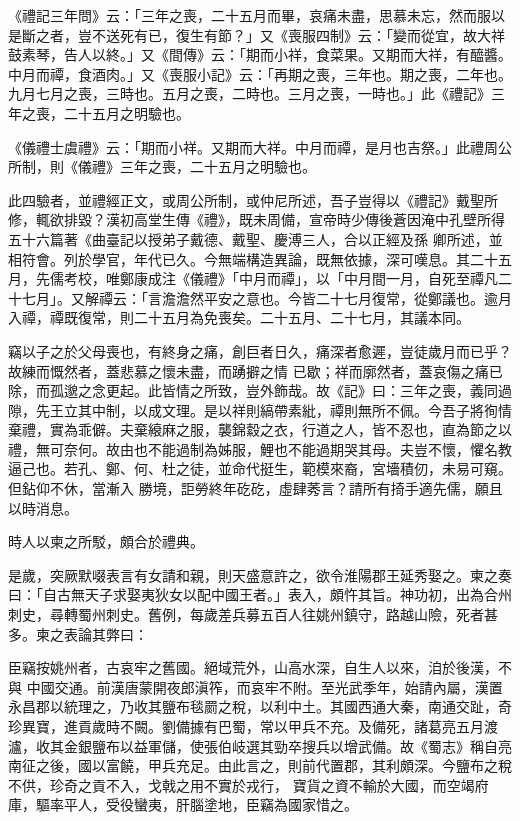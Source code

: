 \begin{pinyinscope}
 《禮記三年問》云：「三年之喪，二十五月而畢，哀痛未盡，思慕未忘，然而服以是斷之者，豈不送死有已，復生有節？」又《喪服四制》云：「變而從宜，故大祥鼓素琴，告人以終。」又《間傳》云：「期而小祥，食菜果。又期而大祥，有醯醬。中月而禫，食酒肉。」又《喪服小記》云：「再期之喪，三年也。期之喪，二年也。
 九月七月之喪，三時也。五月之喪，二時也。三月之喪，一時也。」此《禮記》三年之喪，二十五月之明驗也。



 《儀禮士虞禮》云：「期而小祥。又期而大祥。中月而禫，是月也吉祭。」此禮周公所制，則《儀禮》三年之喪，二十五月之明驗也。



 此四驗者，並禮經正文，或周公所制，或仲尼所述，吾子豈得以《禮記》戴聖所修，輒欲排毀？漢初高堂生傳《禮》，既未周備，宣帝時少傳後蒼因淹中孔壁所得五十六篇著《曲臺記以授弟子戴德、戴聖、慶溥三人，合以正經及孫
 卿所述，並相符會。列於學官，年代已久。今無端構造異論，既無依據，深可嘆息。其二十五月，先儒考校，唯鄭康成注《儀禮》「中月而禫」，以「中月間一月，自死至禫凡二十七月」。又解禫云：「言澹澹然平安之意也。今皆二十七月復常，從鄭議也。逾月入禫，禫既復常，則二十五月為免喪矣。二十五月、二十七月，其議本同。



 竊以子之於父母喪也，有終身之痛，創巨者日久，痛深者愈遲，豈徒歲月而已乎？故練而慨然者，蓋悲慕之懷未盡，而踴擗之情
 已歇；祥而廓然者，蓋哀傷之痛已除，而孤邈之念更起。此皆情之所致，豈外飾哉。故《記》曰：三年之喪，義同過隙，先王立其中制，以成文理。是以祥則縞帶素紕，禫則無所不佩。今吾子將徇情棄禮，實為乖僻。夫棄縗麻之服，襲錦縠之衣，行道之人，皆不忍也，直為節之以禮，無可奈何。故由也不能過制為姊服，鯉也不能過期哭其母。夫豈不懷，懼名教逼己也。若孔、鄭、何、杜之徒，並命代挺生，範模來裔，宮墻積仞，未易可窺。但鉆仰不休，當漸入
 勝境，詎勞終年矻矻，虛肆莠言？請所有掎手適先儒，願且以時消息。



 時人以柬之所駁，頗合於禮典。



 是歲，突厥默啜表言有女請和親，則天盛意許之，欲令淮陽郡王延秀娶之。柬之奏曰：「自古無天子求娶夷狄女以配中國王者。」表入，頗忤其旨。神功初，出為合州刺史，尋轉蜀州刺史。舊例，每歲差兵募五百人往姚州鎮守，路越山險，死者甚多。柬之表論其弊曰：



 臣竊按姚州者，古哀牢之舊國。絕域荒外，山高水深，自生人以來，洎於後漢，不與
 中國交通。前漢唐蒙開夜郎滇筰，而哀牢不附。至光武季年，始請內屬，漢置永昌郡以統理之，乃收其鹽布毯罽之稅，以利中土。其國西通大秦，南通交趾，奇珍異寶，進貢歲時不闕。劉備據有巴蜀，常以甲兵不充。及備死，諸葛亮五月渡瀘，收其金銀鹽布以益軍儲，使張伯岐選其勁卒搜兵以增武備。故《蜀志》稱自亮南征之後，國以富饒，甲兵充足。由此言之，則前代置郡，其利頗深。今鹽布之稅不供，珍奇之貢不入，戈戟之用不實於戎行，
 寶貨之資不輸於大國，而空竭府庫，驅率平人，受役蠻夷，肝腦塗地，臣竊為國家惜之。




\end{pinyinscope}
